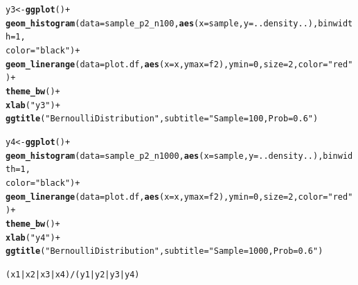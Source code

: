\documentclass{article}\usepackage[]{graphicx}\usepackage[]{color}
\makeatletter
\newcommand{\hlnum}[1]{\textcolor[rgb]{0.686,0.059,0.569}{#1}}%
\newcommand{\hlstr}[1]{\textcolor[rgb]{0.192,0.494,0.8}{#1}}%
\newcommand{\hlopt}[1]{\textcolor[rgb]{0,0,0}{#1}}%
\newcommand{\hlstd}[1]{\textcolor[rgb]{0.345,0.345,0.345}{#1}}%
\newcommand{\hlkwb}[1]{\textcolor[rgb]{0.69,0.353,0.396}{#1}}%
\newcommand{\hlkwc}[1]{\textcolor[rgb]{0.333,0.667,0.333}{#1}}%
\newcommand{\hlkwd}[1]{\textcolor[rgb]{0.737,0.353,0.396}{\textbf{#1}}}%
\newenvironment{kframe}{%
 \def\at@end@of@kframe{}%
 \ifinner\ifhmode%
  \def\at@end@of@kframe{\end{minipage}}%
  \begin{minipage}{\columnwidth}%
 \fi\fi%
 \def\FrameCommand##1{\hskip\@totalleftmargin \hskip-\fboxsep
 \colorbox{shadecolor}{##1}\hskip-\fboxsep
     \hskip-\linewidth \hskip-\@totalleftmargin \hskip\columnwidth}%
 \MakeFramed {\advance\hsize-\width
   \@totalleftmargin\z@ \linewidth\hsize
   \@setminipage}}%
 {\par\unskip\endMakeFramed%
 \at@end@of@kframe}
\newenvironment{knitrout}{}{} %
\makeatother
\begin{document}
\begin{enumerate}
\begin{enumerate}
\begin{knitrout}
\begin{kframe}
\begin{alltt}
                \hlstd{y3}\hlkwb{<-}\hlkwd{ggplot}\hlstd{()}\hlopt{+}
          \hlkwd{geom_histogram}\hlstd{(}\hlkwc{data} \hlstd{= sample_p2_n100,} \hlkwd{aes}\hlstd{(}\hlkwc{x} \hlstd{= sample,} \hlkwc{y}\hlstd{=..density..),} \hlkwc{binwidth}\hlstd{=}\hlnum{1}\hlstd{,}
                         \hlkwc{color}\hlstd{=}\hlstr{"black"}\hlstd{)}\hlopt{+}
          \hlkwd{geom_linerange}\hlstd{(}\hlkwc{data}\hlstd{=plot.df,} \hlkwd{aes}\hlstd{(}\hlkwc{x}\hlstd{=x,} \hlkwc{ymax} \hlstd{= f2),} \hlkwc{ymin} \hlstd{=} \hlnum{0}\hlstd{,} \hlkwc{size}\hlstd{=}\hlnum{2}\hlstd{,} \hlkwc{color}\hlstd{=}\hlstr{"red"}\hlstd{)}\hlopt{+}
          \hlkwd{theme_bw}\hlstd{()} \hlopt{+}
          \hlkwd{xlab}\hlstd{(}\hlstr{"y3"}\hlstd{)}\hlopt{+}
          \hlkwd{ggtitle}\hlstd{(}\hlstr{"Bernoulli Distribution"}\hlstd{,}\hlkwc{subtitle} \hlstd{=} \hlstr{"Sample = 100, Prob =0.6"}\hlstd{)}

                \hlstd{y4}\hlkwb{<-}\hlkwd{ggplot}\hlstd{()}\hlopt{+}
          \hlkwd{geom_histogram}\hlstd{(}\hlkwc{data} \hlstd{= sample_p2_n1000,} \hlkwd{aes}\hlstd{(}\hlkwc{x} \hlstd{= sample,} \hlkwc{y}\hlstd{=..density..),} \hlkwc{binwidth}\hlstd{=}\hlnum{1}\hlstd{,}
                         \hlkwc{color}\hlstd{=}\hlstr{"black"}\hlstd{)}\hlopt{+}
          \hlkwd{geom_linerange}\hlstd{(}\hlkwc{data}\hlstd{=plot.df,} \hlkwd{aes}\hlstd{(}\hlkwc{x}\hlstd{=x,} \hlkwc{ymax} \hlstd{= f2),} \hlkwc{ymin} \hlstd{=} \hlnum{0}\hlstd{,} \hlkwc{size}\hlstd{=}\hlnum{2}\hlstd{,} \hlkwc{color}\hlstd{=}\hlstr{"red"}\hlstd{)}\hlopt{+}
          \hlkwd{theme_bw}\hlstd{()} \hlopt{+}
          \hlkwd{xlab}\hlstd{(}\hlstr{"y4"}\hlstd{)}\hlopt{+}
          \hlkwd{ggtitle}\hlstd{(}\hlstr{"Bernoulli Distribution"}\hlstd{,}\hlkwc{subtitle} \hlstd{=} \hlstr{"Sample = 1000, Prob =0.6"}\hlstd{)}

\hlstd{(x1}\hlopt{|}\hlstd{x2}\hlopt{|}\hlstd{x3}\hlopt{|}\hlstd{x4)}\hlopt{/}\hlstd{(y1}\hlopt{|}\hlstd{y2}\hlopt{|}\hlstd{y3}\hlopt{|}\hlstd{y4)}
\end{alltt}
\end{kframe}
\end{knitrout}


\end{enumerate}
\end{enumerate}
\end{document}
